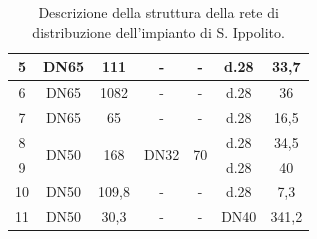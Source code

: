 \documentclass[laurea,oneside,11pt]{USiena_tesiLM}
\begin{document}
\begin{table}[!ht]
{\begin{tabular}{|c|c|c|c|c|c|c|}
5                                             & DN65                  & 111                                    & -                         & -                     & d.28         & 33,7                      \\ \hline
6                                             & DN65                  & 1082                                   & -                         & -                     & d.28         & 36                        \\ \hline
7                                             & DN65                  & 65                                     & -                         & -                     & d.28         & 16,5                      \\ \hline
8                                             & \multirow{2}{*}{DN50} & \multirow{2}{*}{168}                   & \multirow{2}{*}{DN32}     & \multirow{2}{*}{70}   & d.28         & 34,5                      \\ \cline{1-1} \cline{6-7} 
9                                             &                       &                                        &                           &                       & d.28         & 40                        \\ \hline
10                                            & DN50                  & 109,8                                  & -                         & -                     & d.28         & 7,3                       \\ \hline
11                                            & DN50                  & 30,3                                   & -                         & -                     & DN40         & 341,2                     \\ \hline
\end{tabular}}
\caption{Descrizione della struttura della rete di distribuzione dell'impianto di S. Ippolito.}
\label{tab:rete_ippolito}
\end{table}
\end{document}
